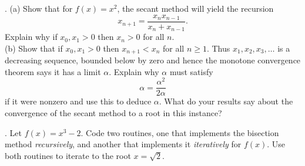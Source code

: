 \documentclass[12 pt]{article}
\begin{document}
\medskip

. (a) Show that for $f(x)=x^2$, the secant method will yield the
recursion $$ x_{n+1} = \frac{x_n x_{n-1}}{x_n + x_{n-1}}.
$$ Explain why if $x_0, x_1 > 0$ then $x_n > 0$ for all $n$. \\
(b) Show that if $x_0, x_1 > 0$ then $x_{n+1} < x_n$ for all $n \geq 1$. Thus
$x_1, x_2, x_3, \dots$ is a decreasing sequence, bounded below by zero and hence
the monotone convergence theorem says it has a limit $\alpha$. Explain why
$\alpha$ must satisfy $$ \alpha = \frac{\alpha^2}{2\alpha} $$ if it were nonzero
and use this to deduce $\alpha$. What do your results say about the convergence
of the secant method to a root in this instance?

\medskip

. Let $f(x) = x^{3} - 2$.  Code two routines, one that implements
the bisection method
\emph{recursively}, and another that implements it \emph{iteratively} for
$f(x)$. Use both routines to iterate to the root $x = \sqrt{2}$.
\end{document}
